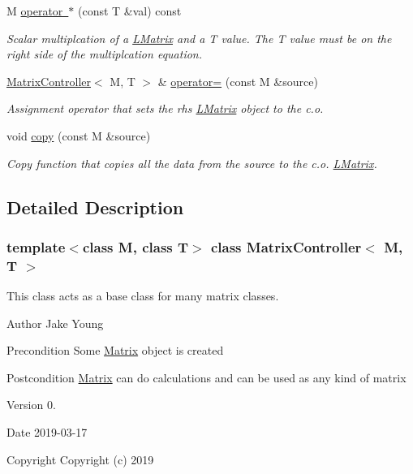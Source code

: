 \begin{DoxyCompactItemize}
M \mbox{\hyperlink{class_matrix_controller_abe35dc2b5a0ce975799995097486893e}{operator $\ast$}} (const T \&val) const
\begin{DoxyCompactList}\small\item\em Scalar multiplcation of a \mbox{\hyperlink{class_l_matrix}{L\+Matrix}} and a T value. The T value must be on the right side of the multiplcation equation. \end{DoxyCompactList}\item 
\mbox{\hyperlink{class_matrix_controller}{Matrix\+Controller}}$<$ M, T $>$ \& \mbox{\hyperlink{class_matrix_controller_ad7a26021ed274944adbc4df6c068de35}{operator=}} (const M \&source)
\begin{DoxyCompactList}\small\item\em Assignment operator that sets the rhs \mbox{\hyperlink{class_l_matrix}{L\+Matrix}} object to the c.\+o. \end{DoxyCompactList}\item 
void \mbox{\hyperlink{class_matrix_controller_aced34d0065a5df3d3fadb140a782a22b}{copy}} (const M \&source)
\begin{DoxyCompactList}\small\item\em Copy function that copies all the data from the source to the c.\+o. \mbox{\hyperlink{class_l_matrix}{L\+Matrix}}. \end{DoxyCompactList}\end{DoxyCompactItemize}


\subsection{Detailed Description}
\subsubsection*{template$<$class M, class T$>$\newline
class Matrix\+Controller$<$ M, T $>$}

This class acts as a base class for many matrix classes. 

\begin{DoxyAuthor}{Author}
Jake Young 
\end{DoxyAuthor}
\begin{DoxyPrecond}{Precondition}
Some \mbox{\hyperlink{class_matrix}{Matrix}} object is created 
\end{DoxyPrecond}
\begin{DoxyPostcond}{Postcondition}
\mbox{\hyperlink{class_matrix}{Matrix}} can do calculations and can be used as any kind of matrix 
\end{DoxyPostcond}
\begin{DoxyVersion}{Version}
0. 
\end{DoxyVersion}
\begin{DoxyDate}{Date}
2019-\/03-\/17
\end{DoxyDate}
\begin{DoxyCopyright}{Copyright}
Copyright (c) 2019 
\end{DoxyCopyright}


